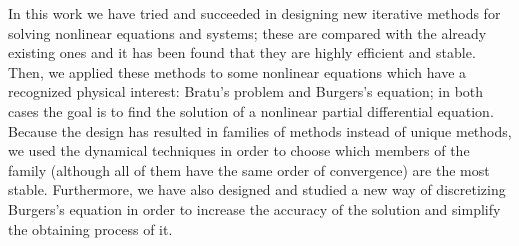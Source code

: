 In this work we have tried and succeeded in designing new iterative methods for solving nonlinear equations and systems; these are compared with the already existing ones and it has been found that they are highly efficient and stable. Then, we applied these methods to some nonlinear equations which have a recognized physical interest: Bratu's problem and Burgers's equation; in both cases the goal is to find the solution of a nonlinear partial differential equation. Because the design has resulted in families of methods instead of unique methods, we used the dynamical techniques in order to choose which members of the family (although all of them have the same order of convergence) are the most stable. Furthermore, we have also designed and studied a new way of discretizing Burgers's equation in order to increase the accuracy of the solution and simplify the obtaining process of it.